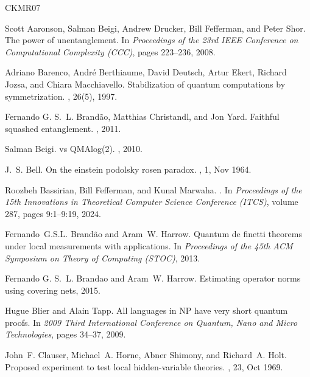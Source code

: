\documentclass[10pt,a4paper]{article}
\theoremstyle{remark}
\newcommand{\1}[1]{\mathds{1}{[#1]}}
\numberwithin{equation}{section}
\begin{document}
\newcommand{\etalchar}[1]{$^{#1}$}
\begin{thebibliography}{CKMR07}

\bibitem[ABD{\etalchar{+}}08]{ABDFS08}
Scott Aaronson, Salman Beigi, Andrew Drucker, Bill Fefferman, and Peter Shor.
\newblock The power of unentanglement.
\newblock In {\em Proceedings of the 23rd IEEE Conference on Computational Complexity (CCC)}, pages 223--236, 2008.

\bibitem[BBD{\etalchar{+}}97]{BBDEJM97}
Adriano Barenco, Andr\'{e} Berthiaume, David Deutsch, Artur Ekert, Richard Jozsa, and Chiara Macchiavello.
\newblock Stabilization of quantum computations by symmetrization.
, 26(5), 1997.

Fernando G. S.~L. Brand{\~{a}}o, Matthias Christandl, and Jon Yard.
\newblock Faithful squashed entanglement.
, 2011.

Salman Beigi.
 vs {QMAlog}(2).
, 2010.

J.~S. Bell.
\newblock On the einstein podolsky rosen paradox.
, 1, Nov 1964.

Roozbeh Bassirian, Bill Fefferman, and Kunal Marwaha.
.
\newblock In {\em Proceedings of the 15th Innovations in Theoretical Computer Science Conference (ITCS)}, volume 287, pages 9:1--9:19, 2024.

Fernando~G.S.L. Brand{\~{a}}o and Aram~W. Harrow.
\newblock Quantum de finetti theorems under local measurements with applications.
\newblock In {\em Proceedings of the 45th ACM Symposium on Theory of Computing (STOC)}, 2013.

Fernando G. S.~L. Brandao and Aram~W. Harrow.
\newblock Estimating operator norms using covering nets, 2015.

Hugue Blier and Alain Tapp.
\newblock All languages in {NP} have very short quantum proofs.
\newblock In {\em 2009 Third International Conference on Quantum, Nano and Micro Technologies}, pages 34--37, 2009.

John~F. Clauser, Michael~A. Horne, Abner Shimony, and Richard~A. Holt.
\newblock Proposed experiment to test local hidden-variable theories.
, 23, Oct 1969.


\end{thebibliography}
\end{document}
